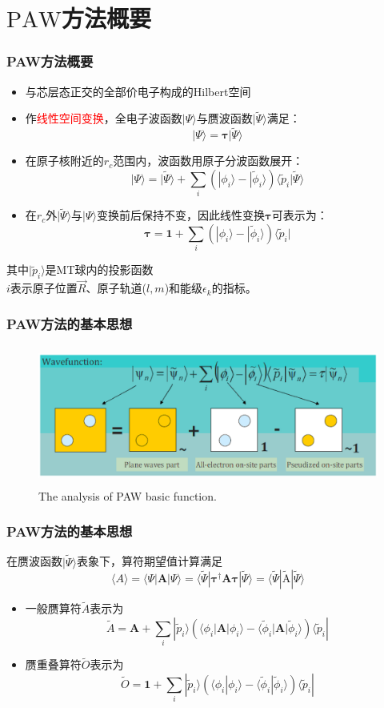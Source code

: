 \documentclass[cjk,slidestop,compress,mathserif,blue]{beamer}
\begin{document}
\section{$\mathrm{PAW}$方法概要}
\frame
{
	\frametitle{\textrm{PAW}方法概要}
\begin{itemize}
	\item 与芯层态正交的全部价电子构成的\textrm{Hilbert}空间%
	\item 作\textcolor{red}{线性空间变换}，全电子波函数$|\Psi\rangle$与赝波函数$|\tilde\Psi\rangle$满足：
		$$|\Psi\rangle=\mathbf{\tau|}\tilde\Psi\rangle$$
	\item 在原子核附近的$r_c$范围内，波函数用原子分波函数展开：
	$$|\Psi\rangle=|\tilde\Psi\rangle+\sum_i(|\phi_i\rangle-|\tilde\phi_i\rangle)\langle\tilde p_i|\tilde\Psi\rangle$$
	\item 在$r_c$外$|\tilde\Psi\rangle$与$|\Psi\rangle$变换前后保持不变，因此线性变换$\mathbf{\tau}$可表示为：
	$$\mathbf{\tau}=\mathbf{1}+\sum_i(|\phi_i\rangle-|\tilde\phi_i\rangle)\langle\tilde p_i|$$
\end{itemize}
其中$|\tilde p_i\rangle$是\textrm{MT}球内的投影函数\\
$i$表示原子位置$\vec R$、原子轨道($l,m$)和能级$\epsilon_k$的指标。
}

\frame
{
	\frametitle{\textrm{PAW}方法的基本思想}
	\vspace{10pt}
\begin{figure}[h!]
\centering
\includegraphics[height=1.8in,width=4.in,viewport=30 210 570 440,clip]{Figures/PAW_projector.eps}
\caption{\small \textrm{The analysis of PAW basic function.}}%
\label{PAW_baisc}
\end{figure}
}

\frame
{
\frametitle{\textrm{PAW}方法的基本思想}
	在赝波函数$|\tilde\Psi\rangle$表象下，算符期望值计算满足$$\langle A \rangle=\langle\Psi|\mathbf{A}|\Psi\rangle=\langle\tilde\Psi|\mathbf{\tau}^{\dag}\mathbf{A}\mathbf{\tau}|\tilde\Psi\rangle=\langle\tilde\Psi|\tilde{\mathrm{A}}|\tilde\Psi\rangle$$
\begin{itemize}
	\item 一般赝算符$\tilde A$表示为
		$$\tilde A=\mathbf{A}+\sum_i|\tilde p_i\rangle(\langle\phi_i|\mathbf{A}|\phi_i\rangle-\langle\tilde\phi_i|\mathbf{A}|\tilde\phi_i\rangle)\langle\tilde p_i|$$
	\item 赝重叠算符$\tilde O$表示为
		$$\tilde O=\mathbf{1}+\sum_i|\tilde p_i\rangle(\langle\phi_i|\phi_i\rangle-\langle\tilde\phi_i|\tilde\phi_i\rangle)\langle\tilde p_i|$$
\end{itemize}
}
\end{document}
